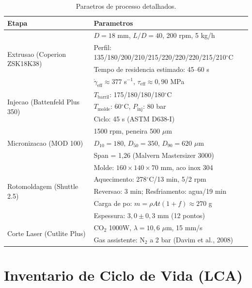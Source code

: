 \documentclass[11pt,a4paper]{article}
\begin{document}
\begin{table}[H]\centering
\caption{Paraetros de processo detalhados.}\label{tab:processo}
\begin{tabular}{ll}
\toprule
{\bfseries Etapa} & {\bfseries Parametros} \\
\midrule
\multirow{4}{*}{Extrusao (Coperion ZSK18K38)} & $D=18$ mm, $L/D=40$, 200 rpm, 5 kg/h \\
& Perfil: 135/180/200/210/215/220/220/220/215/210$^{\circ}$C \\
& Tempo de residencia estimado: 45--60 s \\
& $\dot{\gamma}_{\text{eff}}\approx377$ s$^{-1}$, $\tau_{\text{eff}}\approx0,90$ MPa \\
\midrule
\multirow{3}{*}{Injecao (Battenfeld Plus 350)} & $T_{\text{barril}}$: 175/180/180/180$^{\circ}$C \\
& $T_{\text{molde}}$: 60$^{\circ}$C, $P_{\text{inj}}$: 80 bar \\
& Ciclo: 45 s (ASTM D638-I) \\
\midrule
\multirow{3}{*}{Micronizacao (MOD 100)} & 1500 rpm, peneira 500 $\mu$m \\
& $D_{10}=180$, $D_{50}=350$, $D_{90}=620$ $\mu$m \\
& Span = 1,26 (Malvern Mastersizer 3000) \\
\midrule
\multirow{5}{*}{Rotomoldagem (Shuttle 2.5)} & Molde: $160\times140\times70$ mm, aco inox 304 \\
& Aquecimento: 278$^{\circ}$C/13 min, 5/2 rpm \\
& Reversao: 3 min; Resfriamento: agua/19 min \\
& Carga de po: $m=\rho A t (1+f)\approx270$ g \\
& Espessura: $3,0\pm0,3$ mm (12 pontos) \\
\midrule
\multirow{2}{*}{Corte Laser (Cutlite Plus)} & CO$_2$ 1000W, $\lambda=10,6$ $\mu$m, 15 mm/s \\
& Gas assistente: N$_2$ a 2 bar (Davim et al., 2008) \\
\bottomrule
\end{tabular}
\end{table}

\section{Inventario de Ciclo de Vida (LCA)}
\end{document}
